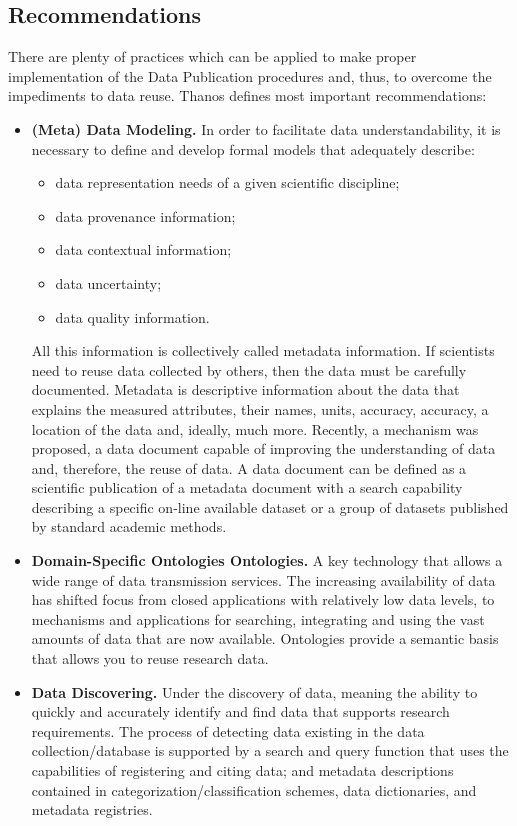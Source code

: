 \subsection{Recommendations}
There are plenty of practices which can be applied to make proper implementation of the Data Publication procedures and, thus, to overcome the impediments to data reuse. Thanos\cite{DBLP:journals/publications/Thanos17} defines most important recommendations:
\begin{itemize}
    \item \textbf{(Meta) Data Modeling.} In order to facilitate data understandability, it is necessary to define and develop formal models that adequately describe:
    \begin{itemize}
        \item data representation needs of a given scientific discipline;
        \item data provenance information;
        \item data contextual information;
        \item data uncertainty;
        \item data quality information.
    \end{itemize}
    All this information is collectively called metadata information. If scientists need to reuse data collected by others, then the data must be carefully documented. Metadata is descriptive information about the data that explains the measured attributes, their names, units, accuracy, accuracy, a location of the data and, ideally, much more. Recently, a mechanism was proposed, a data document capable of improving the understanding of data and, therefore, the reuse of data. A data document can be defined as a scientific publication of a metadata document with a search capability describing a specific on-line available dataset or a group of datasets published by standard academic methods\cite{Chavan2011}.
    \item \textbf{Domain-Specific Ontologies Ontologies.} A key technology that allows a wide range of data transmission services\cite{DBLP:journals/tods/BienvenuCLW14}. The increasing availability of data has shifted focus from closed applications with relatively low data levels, to mechanisms and applications for searching, integrating and using the vast amounts of data that are now available. Ontologies provide a semantic basis that allows you to reuse research data\cite{Gruber:1995:TPD:219666.219701}\cite{DBLP:journals/jods/PoggiLCGLR08}.
    \item \textbf{Data Discovering.} Under the discovery of data, meaning the ability to quickly and accurately identify and find data that supports research requirements. The process of detecting data existing in the data collection/database is supported by a search and query function that uses the capabilities of registering and citing data; and metadata descriptions contained in categorization/classification schemes, data dictionaries, and metadata registries.

\end{itemize}
